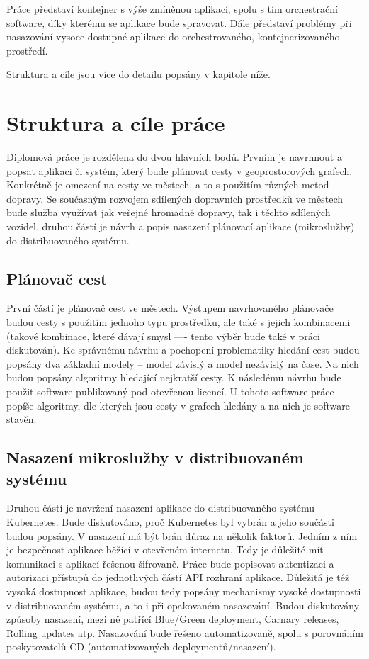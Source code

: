 \documentclass[thesis=M,czech]{FITthesis}[2019/12/23]
\theoremstyle{plain}
\theoremstyle{definition}
\begin{document}
\begin{introduction}
Práce představí kontejner s výše zmíněnou aplikací, spolu s tím orchestrační software, díky kterému se aplikace bude spravovat. Dále představí problémy při nasazování vysoce dostupné aplikace do orchestrovaného, kontejnerizovaného prostředí. 

Struktura a cíle jsou více do detailu popsány v kapitole níže.

\end{introduction}

\chapter{Struktura a cíle práce}

Diplomová práce je rozdělena do dvou hlavních bodů. Prvním je navrhnout a popsat aplikaci či systém, který bude plánovat cesty v geoprostorových grafech. Konkrétně je omezení  na cesty ve městech, a to s použitím různých metod dopravy. Se současným rozvojem sdílených dopravních prostředků ve městech bude služba využívat jak veřejné hromadné dopravy, tak i těchto sdílených vozidel. druhou částí je návrh a popis nasazení plánovací aplikace (mikroslužby) do distribuovaného systému.

\section{Plánovač cest}

První částí je plánovač cest ve městech. Výstupem navrhovaného plánovače budou cesty s použitím jednoho typu prostředku, ale také s jejich kombinacemi (takové kombinace, které dávají smysl —- tento výběr bude také v práci diskutován).  Ke správnému návrhu a pochopení problematiky hledání cest budou popsány dva základní modely -- model závislý a model nezávislý na čase. Na nich budou popsány algoritmy hledající nejkratší cesty.  K následému návrhu bude použit software publikovaný pod otevřenou licencí. U tohoto software práce popíše algoritmy, dle kterých jsou cesty v grafech hledány a na nich je software stavěn. 

\section{Nasazení mikroslužby v distribuovaném systému}

Druhou částí je navržení nasazení aplikace do distribuovaného systému Kubernetes. Bude diskutováno, proč Kubernetes byl vybrán a jeho součásti budou popsány. V nasazení má být brán důraz na několik faktorů. Jedním z ním je bezpečnost aplikace běžící v otevřeném internetu. Tedy je důležité mít komunikaci s aplikací řešenou šifrovaně. Práce bude popisovat autentizaci a autorizaci přístupů do jednotlivých částí API rozhraní aplikace. Důležitá je též vysoká dostupnost aplikace, budou tedy popsány mechanismy vysoké dostupnosti v distribuovaném systému, a to i při opakovaném nasazování. Budou diskutovány způsoby nasazení, mezi ně patřící Blue/Green deployment, Carnary releases, Rolling updates atp. Nasazování bude řešeno automatizovaně, spolu s porovnáním poskytovatelů CD (automatizovaných deploymentů/nasazení).
\end{document}
